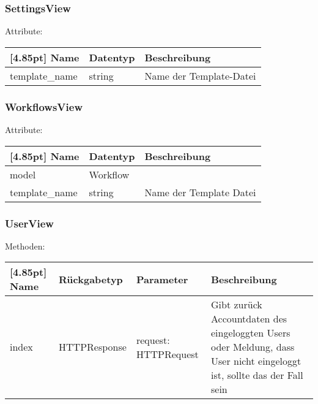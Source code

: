 		\subsubsection{SettingsView}
		
		Attribute:
        \begin{center}
        	\renewcommand{\arraystretch}{1.5}
            \setlength\tabcolsep{5pt}
        	\begin{tabularx}{\textwidth}{|l|l|X|}
        		\hline
                \rowcolor[gray]{0.75}[4.85pt]            		
        	    Name & Datentyp & Beschreibung \\ \hline
        	    template_name & string & Name der Template-Datei \\ \hline		
        	\end{tabularx}
        \end{center}

		\subsubsection{WorkflowsView}

        Attribute:
        \begin{center}
        	\renewcommand{\arraystretch}{1.5}
            \setlength\tabcolsep{5pt}
        	\begin{tabularx}{\textwidth}{|l|l|X|}
        		\hline
                \rowcolor[gray]{0.75}[4.85pt]            		
        	    Name & Datentyp & Beschreibung \\ \hline
        	    model & Workflow &  \\ \hline
        		template\_name & string & Name der Template Datei \\ \hline				
        	\end{tabularx}
        \end{center}
		
		\subsubsection{UserView}
		
		Methoden:
		\begin{center}
		    \setlength\tabcolsep{5pt}
        	\renewcommand{\arraystretch}{1.5}
            	\begin{tabularx}{\textwidth}{|l|l|l|X|}
            	\hline
            	\rowcolor[gray]{0.75}[4.85pt]
        		Name & Rückgabetyp & Parameter & Beschreibung \\ \hline 
                index & HTTPResponse & request: HTTPRequest & Gibt zurück Accountdaten des eingeloggten Users oder Meldung, dass User nicht eingeloggt ist, sollte das der Fall sein \\ \hline
            	\end{tabularx}
		\end{center}
		
